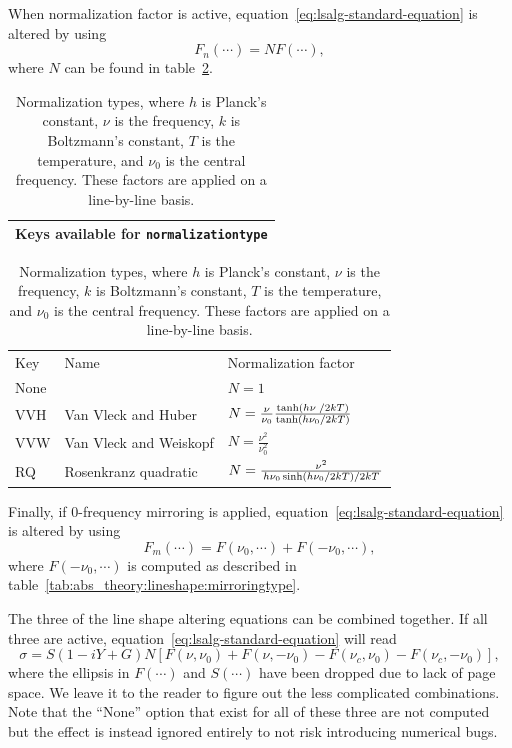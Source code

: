 When normalization factor is active, equation~\ref{eq:lsalg-standard-equation} is altered by using
\begin{equation}
 F_n(\cdots) = N F(\cdots),
\end{equation}
where $N$ can be found in table~\ref{tab:abs_theory:lineshape:normalizationtype}.

\begin{table}[ht!]
 \centering
 \begin{tabular}{c}
  Keys available for \verb|normalizationtype|\\\hline
 \end{tabular}
 \begin{tabular}{lll}
  Key&Name&Normalization factor\\
  None&&$N=1$\\[5pt]
  VVH&Van Vleck and Huber& $N = \frac{\nu}{\nu_0}\frac{\tanh \left( h\nu \; \middle/ 2kT \right)}{\tanh \left( h\nu_0 \middle/ 2kT \right)} $ \\[5pt]
  VVW&Van Vleck and Weiskopf&$N = \frac{\nu^2}{\nu^2_0}$\\[5pt]
  RQ&Rosenkranz quadratic& $N = \frac{\nu^2 }{\left. h\nu_0 \sinh\left( h\nu_0 \middle/ 2kT \right) \middle/ 2kT \right.} $
 \end{tabular}
 \caption{Normalization types, where $h$ is Planck's constant, $\nu$ is the frequency, $k$ is Boltzmann's constant,
 $T$ is the temperature, and $\nu_0$ is the central frequency.  These factors are applied on a line-by-line basis.}
 \label{tab:abs_theory:lineshape:normalizationtype}
\end{table}

Finally, if 0-frequency mirroring is applied, equation~\ref{eq:lsalg-standard-equation}
is altered by using
\begin{equation}
 F_m(\cdots)= F(\nu_0, \cdots) + F(-\nu_0, \cdots),
\end{equation}
where $F(-\nu_0, \cdots)$ is computed as described in table~\ref{tab:abs_theory:lineshape:mirroringtype}.

The three of the line shape altering equations can be combined together.  If all three are active,
equation~\ref{eq:lsalg-standard-equation} will read
\begin{equation}
 \sigma = S \left(1 - iY + G\right) N \left[F\left(\nu, \nu_0 \right) + F\left(\nu, -\nu_0 \right) - F\left(\nu_c, \nu_0 \right)  - F\left(\nu_c, -\nu_0 \right) \right],
\end{equation}
where the ellipsis in $F(\cdots)$ and $S(\cdots)$ have been dropped due to lack of page space.
We leave it to the reader to figure out the less complicated combinations.
Note that the ``None'' option that exist for all of these three are not computed but
the effect is instead ignored entirely to not risk introducing numerical bugs.

